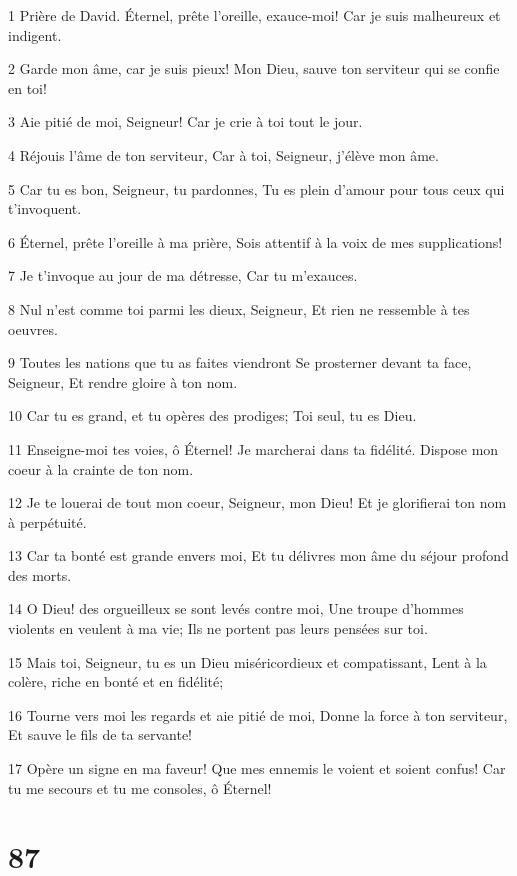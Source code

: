 \par 1 Prière de David. Éternel, prête l'oreille, exauce-moi! Car je suis malheureux et indigent.
\par 2 Garde mon âme, car je suis pieux! Mon Dieu, sauve ton serviteur qui se confie en toi!
\par 3 Aie pitié de moi, Seigneur! Car je crie à toi tout le jour.
\par 4 Réjouis l'âme de ton serviteur, Car à toi, Seigneur, j'élève mon âme.
\par 5 Car tu es bon, Seigneur, tu pardonnes, Tu es plein d'amour pour tous ceux qui t'invoquent.
\par 6 Éternel, prête l'oreille à ma prière, Sois attentif à la voix de mes supplications!
\par 7 Je t'invoque au jour de ma détresse, Car tu m'exauces.
\par 8 Nul n'est comme toi parmi les dieux, Seigneur, Et rien ne ressemble à tes oeuvres.
\par 9 Toutes les nations que tu as faites viendront Se prosterner devant ta face, Seigneur, Et rendre gloire à ton nom.
\par 10 Car tu es grand, et tu opères des prodiges; Toi seul, tu es Dieu.
\par 11 Enseigne-moi tes voies, ô Éternel! Je marcherai dans ta fidélité. Dispose mon coeur à la crainte de ton nom.
\par 12 Je te louerai de tout mon coeur, Seigneur, mon Dieu! Et je glorifierai ton nom à perpétuité.
\par 13 Car ta bonté est grande envers moi, Et tu délivres mon âme du séjour profond des morts.
\par 14 O Dieu! des orgueilleux se sont levés contre moi, Une troupe d'hommes violents en veulent à ma vie; Ils ne portent pas leurs pensées sur toi.
\par 15 Mais toi, Seigneur, tu es un Dieu miséricordieux et compatissant, Lent à la colère, riche en bonté et en fidélité;
\par 16 Tourne vers moi les regards et aie pitié de moi, Donne la force à ton serviteur, Et sauve le fils de ta servante!
\par 17 Opère un signe en ma faveur! Que mes ennemis le voient et soient confus! Car tu me secours et tu me consoles, ô Éternel!

\chapter{87}

